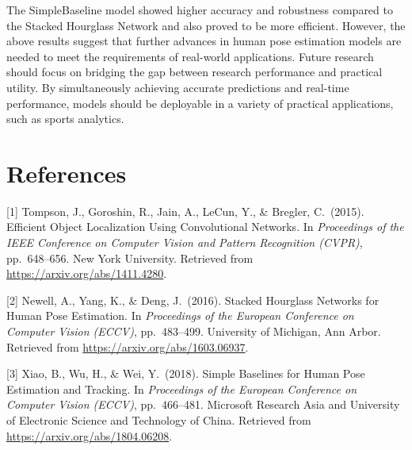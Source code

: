 \documentclass{article}
\begin{document}
The SimpleBaseline model showed higher accuracy and robustness compared to the Stacked Hourglass Network and also proved to be more efficient. However, the above results suggest that further advances in human pose estimation models are needed to meet the requirements of real-world applications. Future research should focus on bridging the gap between research performance and practical utility. By simultaneously achieving accurate predictions and real-time performance, models should be deployable in a variety of practical applications, such as sports analytics.

\section*{References}
[1] Tompson, J., Goroshin, R., Jain, A., LeCun, Y., \& Bregler, C.\ (2015). Efficient Object Localization Using Convolutional Networks. In {\it Proceedings of the IEEE Conference on Computer Vision and Pattern Recognition (CVPR)}, pp.\ 648–656. New York University. Retrieved from \url{https://arxiv.org/abs/1411.4280}.

[2] Newell, A., Yang, K., \& Deng, J.\ (2016). Stacked Hourglass Networks for Human Pose Estimation. In {\it Proceedings of the European Conference on Computer Vision (ECCV)}, pp.\ 483–499. University of Michigan, Ann Arbor. Retrieved from \url{https://arxiv.org/abs/1603.06937}.

[3] Xiao, B., Wu, H., \& Wei, Y.\ (2018). Simple Baselines for Human Pose Estimation and Tracking. In {\it Proceedings of the European Conference on Computer Vision (ECCV)}, pp.\ 466–481. Microsoft Research Asia and University of Electronic Science and Technology of China. Retrieved from \url{https://arxiv.org/abs/1804.06208}.
\end{document}
